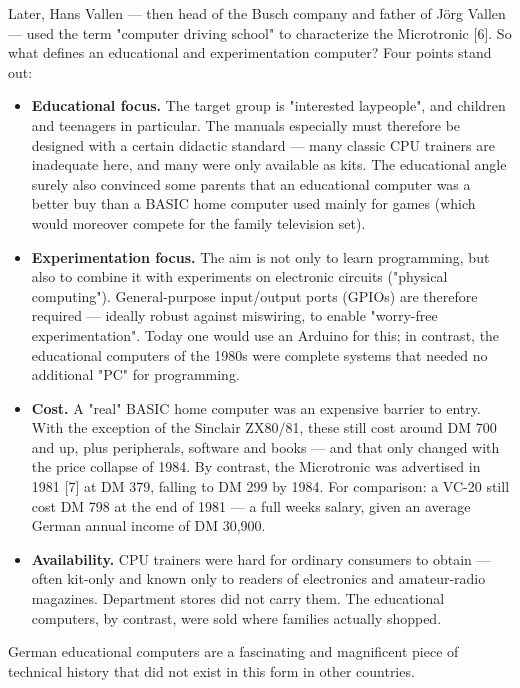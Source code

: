 \documentclass[
  11pt,
  letterpaper,
]{article}
\providecommand{\tightlist}{%
  \setlength{\itemsep}{0pt}\setlength{\parskip}{0pt}}
\begin{document}
Later, Hans Vallen --- then head of the Busch company and father of Jörg
Vallen --- used the term "computer driving school" to characterize the
Microtronic {[}6{]}. So what defines an educational and experimentation
computer? Four points stand out:

\begin{itemize}
\tightlist
\item
  \textbf{Educational focus.} The target group is "interested
  laypeople", and children and teenagers in particular. The manuals
  especially must therefore be designed with a certain didactic standard
  --- many classic CPU trainers are inadequate here, and many were only
  available as kits. The educational angle surely also convinced some
  parents that an educational computer was a better buy than a BASIC
  home computer used mainly for games (which would moreover compete for
  the family television set).
\item
  \textbf{Experimentation focus.} The aim is not only to learn
  programming, but also to combine it with experiments on electronic
  circuits ("physical computing"). General-purpose input/output ports
  (GPIOs) are therefore required --- ideally robust against miswiring,
  to enable "worry-free experimentation". Today one would use an Arduino
  for this; in contrast, the educational computers of the 1980s were
  complete systems that needed no additional "PC" for programming.
\item
  \textbf{Cost.} A "real" BASIC home computer was an expensive barrier
  to entry. With the exception of the Sinclair ZX80/81, these still cost
  around DM 700 and up, plus peripherals, software and books --- and
  that only changed with the price collapse of 1984. By contrast, the
  Microtronic was advertised in 1981 {[}7{]} at DM 379, falling to DM
  299 by 1984. For comparison: a VC-20 still cost DM 798 at the end of
  1981 --- a full week\textquotesingle s salary, given an average German
  annual income of DM 30,900.
\item
  \textbf{Availability.} CPU trainers were hard for ordinary consumers
  to obtain --- often kit-only and known only to readers of electronics
  and amateur-radio magazines. Department stores did not carry them. The
  educational computers, by contrast, were sold where families actually
  shopped.
\end{itemize}

German educational computers are a fascinating and magnificent piece of
technical history that did not exist in this form in other countries.
\end{document}
